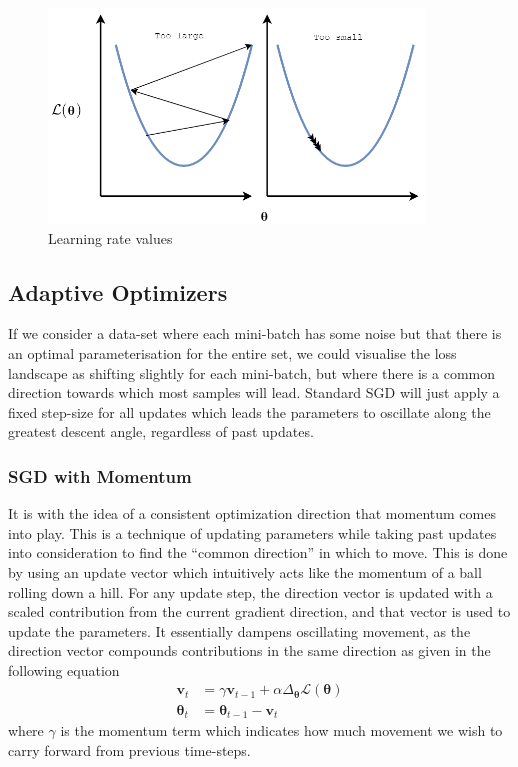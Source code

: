 \documentclass{report}
\begin{document}
\begin{figure}[h]
 \centering
 \includegraphics[width=10cm]{learningrate}
 \caption{Learning rate values}
 \label{fig:learning-rate:1}
\end{figure}

\subsection{Adaptive Optimizers} \label{optimizers:1}
If we consider a data-set where each mini-batch has some noise but that there is an optimal parameterisation for the entire set, we could visualise the loss landscape as shifting slightly for each mini-batch, but where there is a common direction towards which most samples will lead. Standard SGD will just apply a fixed step-size for all updates which leads the parameters to oscillate along the greatest descent angle, regardless of past updates. \par

\subsubsection{SGD with Momentum}
It is with the idea of a consistent optimization direction that momentum \parencite{backprop} comes into play. This is a technique of updating parameters while taking past updates into consideration to find the ``common direction'' in which to move. This is done by using an update vector which intuitively acts like the momentum of a ball rolling down a hill. For any update step, the direction vector is updated with a scaled contribution from the current gradient direction, and that vector is used to update the parameters. It essentially dampens oscillating movement, as the direction vector compounds contributions in the same direction as given in the following equation
\begin{align}
 \bm{v}_t      & = \gamma \bm{v}_{t-1} + \alpha \Delta_{\bm{\theta}} \mathcal{L}(\bm{\theta}) \\
 \bm{\theta}_t & = \bm{\theta}_{t-1} - \bm{v}_t
\end{align}
where $\gamma$ is the momentum term which indicates how much movement we wish to carry forward from previous time-steps.
\end{document}
